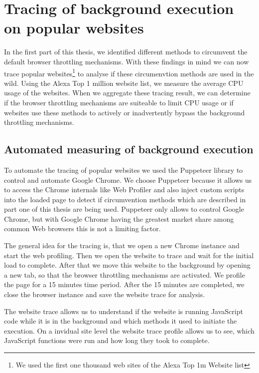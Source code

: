 \documentclass[article,type=bsc,colorback,accentcolor=tud9c]{tudthesis}
\begin{document}
  \newpage
  \section{Tracing of background execution on popular websites}

  In the first part of this thesis, we identified different methods to circumvent the default browser throttling mechanisms. With these findings in mind we can now trace popular websites\footnote{We used the first one thousand web sites of the Alexa Top 1m Website list} to analyse if these circumenvtion methods are used in the wild. Using the Alexa Top 1 million website list, we measure the average CPU usage of the websites. When we aggregate these tracing result, we can determine if the browser throttling mechanisms are suiteable to limit CPU usage or if websites use these methods to actively or inadvertently bypass the background throttling mechanisms.
  
  \subsection{Automated measuring of background execution}

  To automate the tracing of popular websites we used the Puppeteer\cite{pptr} library to control and automate Google Chrome. We choose Puppeteer because it allows us to access the Chrome internals like Web Profiler and also inject custom scripts into the loaded page to detect if circumvention methods which are described in part one of this thesis are being used. Puppeteer only allows to control Google Chrome, but with Google Chrome having the greatest market share among common Web browsers this is not a limiting factor.

  The general idea for the tracing is, that we open a new Chrome instance and start the web profiling. Then we open the website to trace and wait for the initial load to complete. After that we move this website to the background by opening a new tab, so that the browser throttling mechanisms are activated. We profile the page for a 15 minutes time period. After the 15 minutes are completed, we close the browser instance and save the website trace for analysis.

  The website trace allows us to understand if the website is running JavaScript code while it is in the background and which methods it used to initiate the execution. On a invidual site level the website trace profile allows us to see, which JavaScript functions were run and how long they took to complete.
\end{document}
